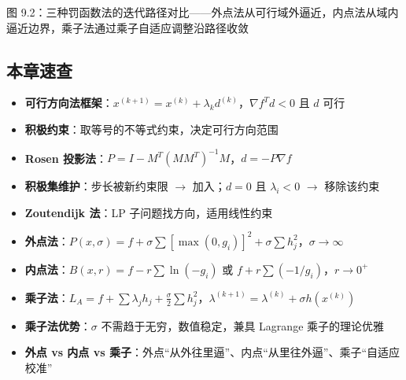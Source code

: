 {\begin{center}
\par\smallskip
{\small 图 9.2：三种罚函数法的迭代路径对比——外点法从可行域外逼近，内点法从域内逼近边界，乘子法通过乘子自适应调整沿路径收敛}
\end{center}}

\medskip

\clearpage\subsection{本章速查}

\begin{itemize}
  \item \textbf{可行方向法框架}：$x^{(k+1)} = x^{(k)} + \lambda_k d^{(k)}$，$\nabla f^T d < 0$ 且 $d$ 可行
  \item \textbf{积极约束}：取等号的不等式约束，决定可行方向范围
  \item \textbf{Rosen 投影法}：$P = I - M^T(MM^T)^{-1}M$，$d = -P\nabla f$
  \item \textbf{积极集维护}：步长被新约束限 $\to$ 加入；$d=0$ 且 $\lambda_i<0$ $\to$ 移除该约束
  \item \textbf{Zoutendijk 法}：LP 子问题找方向，适用线性约束
  \item \textbf{外点法}：$P(x,\sigma) = f + \sigma\sum[\max(0,g_i)]^2 + \sigma\sum h_j^2$，$\sigma \to \infty$
  \item \textbf{内点法}：$B(x,r) = f - r\sum\ln(-g_i)$ 或 $f + r\sum(-1/g_i)$，$r \to 0^+$
  \item \textbf{乘子法}：$L_A = f + \sum\lambda_j h_j + \frac{\sigma}{2}\sum h_j^2$，$\lambda^{(k+1)} = \lambda^{(k)} + \sigma h(x^{(k)})$
  \item \textbf{乘子法优势}：$\sigma$ 不需趋于无穷，数值稳定，兼具 Lagrange 乘子的理论优雅
  \item \textbf{外点 vs 内点 vs 乘子}：外点“从外往里逼”、内点“从里往外逼”、乘子“自适应校准”
\end{itemize}
